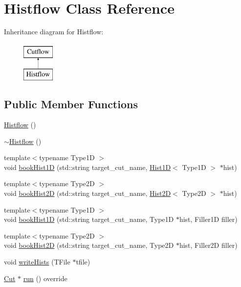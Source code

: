 \hypertarget{classHistflow}{}\section{Histflow Class Reference}
\label{classHistflow}
Inheritance diagram for Histflow\+:\begin{figure}[H]
\begin{center}
\leavevmode
\includegraphics[height=2.000000cm]{classHistflow}
\end{center}
\end{figure}
\subsection*{Public Member Functions}
\begin{DoxyCompactItemize}
\item 
\hyperlink{classHistflow_ae4c76353f6d545eca787fc0abf1a433e}{Histflow} ()
\item 
\hyperlink{classHistflow_aa1adf4cd5e253c51f4e9febf97e11da1}{$\sim$\+Histflow} ()
\item 
{\footnotesize template$<$typename Type1D $>$ }\\void \hyperlink{classHistflow_a0fc41c86984acdd1b2a271be83ecf69d}{book\+Hist1D} (std\+::string target\+\_\+cut\+\_\+name, \hyperlink{classHist1D}{Hist1D}$<$ Type1D $>$ $\ast$hist)
\item 
{\footnotesize template$<$typename Type2D $>$ }\\void \hyperlink{classHistflow_a16858deb3566f6b64c4ac21c309d0a2c}{book\+Hist2D} (std\+::string target\+\_\+cut\+\_\+name, \hyperlink{classHist2D}{Hist2D}$<$ Type2D $>$ $\ast$hist)
\item 
{\footnotesize template$<$typename Type1D $>$ }\\void \hyperlink{classHistflow_a07a698624a6376ebdcef8ef9b025ef33}{book\+Hist1D} (std\+::string target\+\_\+cut\+\_\+name, Type1D $\ast$hist, Filler1D filler)
\item 
{\footnotesize template$<$typename Type2D $>$ }\\void \hyperlink{classHistflow_a425698092efa7ec2389b9fb83d26dc84}{book\+Hist2D} (std\+::string target\+\_\+cut\+\_\+name, Type2D $\ast$hist, Filler2D filler)
\item 
void \hyperlink{classHistflow_a06a2e1683cdc7ac2731b4608abe15eb7}{write\+Hists} (T\+File $\ast$tfile)
\item 
\hyperlink{classCut}{Cut} $\ast$ \hyperlink{classHistflow_aeb075eb05c888a31fc059a97aab22acd}{run} () override
\end{DoxyCompactItemize}
